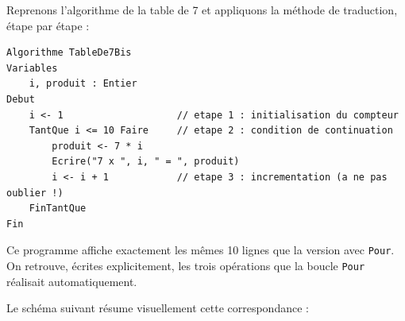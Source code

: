 \documentclass[11pt]{article}
\begin{document}
\begin{exemplebox}
Reprenons l'algorithme de la table de 7 et appliquons la méthode de traduction, étape par étape :
\begin{lstlisting}
Algorithme TableDe7Bis
Variables
    i, produit : Entier
Debut
    i <- 1                    // etape 1 : initialisation du compteur
    TantQue i <= 10 Faire     // etape 2 : condition de continuation
        produit <- 7 * i
        Ecrire("7 x ", i, " = ", produit)
        i <- i + 1            // etape 3 : incrementation (a ne pas oublier !)
    FinTantQue
Fin
\end{lstlisting}
Ce programme affiche exactement les mêmes 10 lignes que la version avec \texttt{Pour}. On retrouve, écrites explicitement, les trois opérations que la boucle \texttt{Pour} réalisait automatiquement.
\end{exemplebox}

Le schéma suivant résume visuellement cette correspondance :
\end{document}
